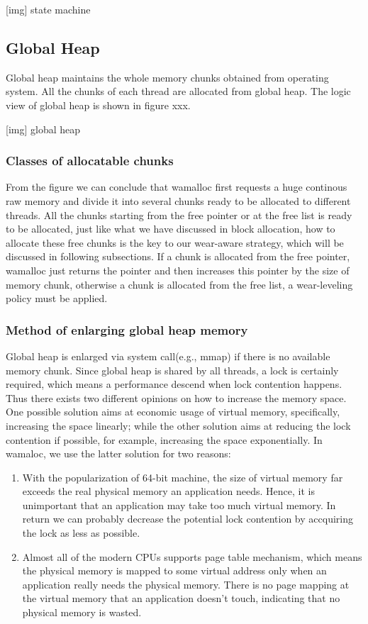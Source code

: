 \documentclass{vldb}
\begin{document}
[img] state machine

\subsection{Global Heap}

Global heap maintains the whole memory chunks obtained from operating system. 
All the chunks of each thread are allocated from global heap. 
The logic view of global heap is shown in figure xxx.

[img] global heap

\subsubsection{Classes of allocatable chunks}
From the figure we can conclude that wamalloc first requests a huge continous raw memory and divide it into several chunks ready to be allocated to different threads.
All the chunks starting from the free pointer or at the free list is ready to be allocated, 
just like what we have discussed in block allocation, how to allocate these free chunks is the key to our wear-aware strategy,
which will be discussed in following subsections.
If a chunk is allocated from the free pointer, wamalloc just returns the pointer and then increases this pointer by the size of memory chunk, 
otherwise a chunk is allocated from the free list, a wear-leveling policy must be applied.

\subsubsection{Method of enlarging global heap memory}
Global heap is enlarged via system call(e.g., mmap) if there is no available memory chunk.
Since global heap is shared by all threads, a lock is certainly required, which means a performance descend when lock contention happens.
Thus there exists two different opinions on how to increase the memory space. 
One possible solution aims at economic usage of virtual memory, specifically, increasing the space linearly;
while the other solution aims at reducing the lock contention if possible, for example, increasing the space exponentially. 
In wamaloc, we use the latter solution for two reasons: 
\begin{enumerate}
    \item With the popularization of 64-bit machine, the size of virtual memory far exceeds the real physical memory an application needs.
Hence, it is unimportant that an application may take too much virtual memory. In return we can probably decrease the potential lock contention by accquiring the lock as less as possible.
    \item Almost all of the modern CPUs supports page table mechanism, which means the physical memory is mapped to some virtual address only when an application really needs the physical memory. There is no page mapping at the virtual memory that an application doesn't touch, indicating that no physical memory is wasted.
\end{enumerate}
\end{document}
